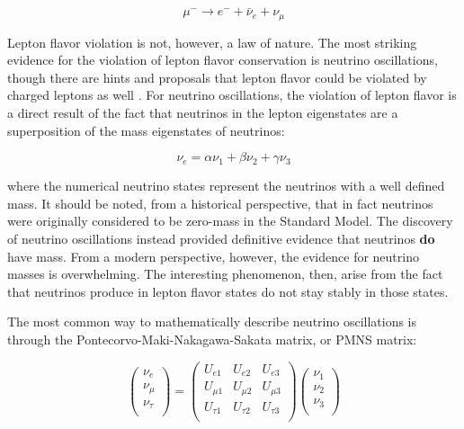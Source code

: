 \begin{equation}
\mu^- \rightarrow e^- + \bar{\nu}_e + \nu_\mu
\end{equation}

Lepton flavor violation is not, however, a law of nature.  The most striking evidence for the violation of lepton flavor conservation is neutrino oscillations, though there are hints and proposals that lepton flavor could be violated by charged leptons as well \cite{mu2e}.  For neutrino oscillations, the violation of lepton flavor is a direct result of the fact that neutrinos in the lepton eigenstates are a superposition of the mass eigenstates of neutrinos:

\begin{equation}
\nu_e = \alpha \nu_1 + \beta \nu_2 + \gamma \nu_3
\end{equation}

where the numerical neutrino states represent the neutrinos with a well defined mass.  It should be noted, from a historical perspective, that in fact neutrinos were originally considered to be zero-mass in the Standard Model.  The discovery of neutrino oscillations instead provided definitive evidence that neutrinos {\bf do} have mass.  From a modern perspective, however, the evidence for neutrino masses is overwhelming.  The interesting phenomenon, then, arise from the fact that neutrinos produce in lepton flavor states do not stay stably in those states.  

The most common way to mathematically describe neutrino oscillations is through the Pontecorvo-Maki-Nakagawa-Sakata matrix, or PMNS matrix:

\begin{equation}
  \left(
  \begin{array}{c}
    \nu_e \\
    \nu_\mu \\
    \nu_\tau \\
  \end{array}
  \right)
  =
  \left(
  \begin{array}{ccc}
    U_{e1} & U_{e2} & U_{e3}  \\
    U_{\mu1} & U_{\mu2} & U_{\mu3}  \\
    U_{\tau1} & U_{\tau2} & U_{\tau3}  \\
  \end{array} 
  \right)
  \left(
  \begin{array}{c}
    \nu_1 \\
    \nu_2 \\
    \nu_3 \\
  \end{array}
  \right)
\end{equation}

